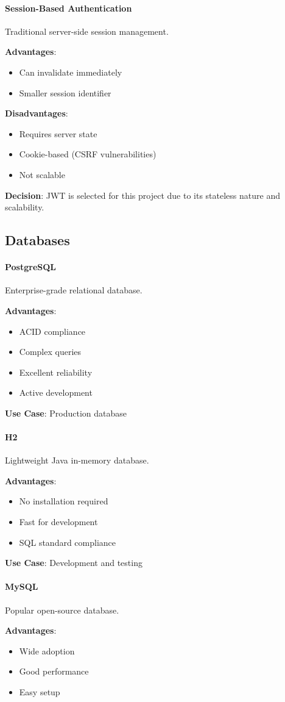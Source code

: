 \documentclass[12pt,a4paper,twoside]{book}
\newcommand{\subsubsubsection}[1]{\paragraph{#1}}
\begin{document}
\subsubsubsection{Session-Based Authentication}
Traditional server-side session management.

\textbf{Advantages}:
\begin{itemize}
    \item Can invalidate immediately
    \item Smaller session identifier
\end{itemize}

\textbf{Disadvantages}:
\begin{itemize}
    \item Requires server state
    \item Cookie-based (CSRF vulnerabilities)
    \item Not scalable
\end{itemize}

\textbf{Decision}: JWT is selected for this project due to its stateless nature and scalability.

\subsection{Databases}

\subsubsubsection{PostgreSQL}
Enterprise-grade relational database.

\textbf{Advantages}:
\begin{itemize}
    \item ACID compliance
    \item Complex queries
    \item Excellent reliability
    \item Active development
\end{itemize}

\textbf{Use Case}: Production database

\subsubsubsection{H2}
Lightweight Java in-memory database.

\textbf{Advantages}:
\begin{itemize}
    \item No installation required
    \item Fast for development
    \item SQL standard compliance
\end{itemize}

\textbf{Use Case}: Development and testing

\subsubsubsection{MySQL}
Popular open-source database.

\textbf{Advantages}:
\begin{itemize}
    \item Wide adoption
    \item Good performance
    \item Easy setup
\end{itemize}
\end{document}
